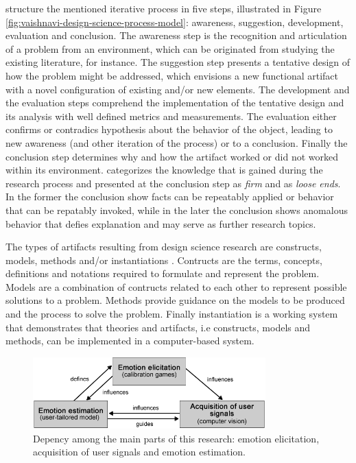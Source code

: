 \textcite{vaishnavi2004design} structure the mentioned iterative process in five steps, illustrated in Figure \ref{fig:vaishnavi-design-science-process-model}: awareness, suggestion, development, evaluation and conclusion. The awareness step is the recognition and articulation of a problem from an environment, which can be originated from studying the existing literature, for instance. The suggestion step presents a tentative design of how the problem might be addressed, which envisions a new functional artifact with a novel configuration of existing and/or new elements. The development and the evaluation steps comprehend the implementation of the tentative design and its analysis with well defined metrics and measurements. The evaluation either confirms or contradics hypothesis about the behavior of the object, leading to new awareness (and other iteration of the process) or to a conclusion. Finally the conclusion step determines why and how the artifact worked or did not worked within its environment. \textcite{vaishnavi2004design} categorizes the knowledge that is gained during the research process and presented at the conclusion step as \textit{firm} and as \textit{loose ends}. In the former the conclusion show facts can be repeatably applied or behavior that can be repatably invoked, while in the later the conclusion shows anomalous behavior that defies explanation and may serve as further research topics.

The types of artifacts resulting from design science research are constructs, models, methods and/or instantiations \parencite{oates2005researching,johannesson2014introduction}. Contructs are the terms, concepts, definitions and notations required to formulate and represent the problem. Models are a combination of contructs related to each other to represent possible solutions to a problem. Methods provide guidance on the models to be produced and the process to solve the problem. Finally instantiation is a working system that demonstrates that theories and artifacts, i.e constructs, models and methods, can be implemented in a computer-based system.

\begin{figure}[h]
    \centering
    \includegraphics[width=0.8\textwidth]{figures/method-components-dependency.png}
    \caption{Depency among the main parts of this research: emotion elicitation, acquisition of user signals and emotion estimation.}
    \label{fig:method-components-dependency}
\end{figure}

